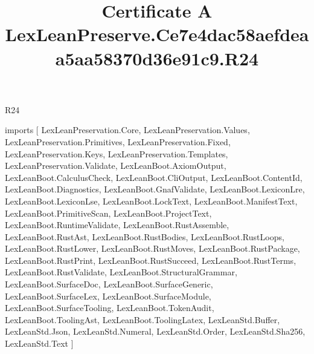 \begin{lexlean}{R24}
\title{Certificate A LexLeanPreserve.Ce7e4dac58aefdeaa5aa58370d36e91c9.R24}
\begin{coremodule}
imports [
  LexLeanPreservation.Core,
  LexLeanPreservation.Values,
  LexLeanPreservation.Primitives,
  LexLeanPreservation.Fixed,
  LexLeanPreservation.Keys,
  LexLeanPreservation.Templates,
  LexLeanPreservation.Validate,
  LexLeanBoot.AxiomOutput,
  LexLeanBoot.CalculusCheck,
  LexLeanBoot.CliOutput,
  LexLeanBoot.ContentId,
  LexLeanBoot.Diagnostics,
  LexLeanBoot.GnafValidate,
  LexLeanBoot.LexiconLre,
  LexLeanBoot.LexiconLse,
  LexLeanBoot.LockText,
  LexLeanBoot.ManifestText,
  LexLeanBoot.PrimitiveScan,
  LexLeanBoot.ProjectText,
  LexLeanBoot.RuntimeValidate,
  LexLeanBoot.RustAssemble,
  LexLeanBoot.RustAst,
  LexLeanBoot.RustBodies,
  LexLeanBoot.RustLoops,
  LexLeanBoot.RustLower,
  LexLeanBoot.RustMoves,
  LexLeanBoot.RustPackage,
  LexLeanBoot.RustPrint,
  LexLeanBoot.RustSucceed,
  LexLeanBoot.RustTerms,
  LexLeanBoot.RustValidate,
  LexLeanBoot.StructuralGrammar,
  LexLeanBoot.SurfaceDoc,
  LexLeanBoot.SurfaceGeneric,
  LexLeanBoot.SurfaceLex,
  LexLeanBoot.SurfaceModule,
  LexLeanBoot.SurfaceTooling,
  LexLeanBoot.TokenAudit,
  LexLeanBoot.ToolingAst,
  LexLeanBoot.ToolingLatex,
  LexLeanStd.Buffer,
  LexLeanStd.Json,
  LexLeanStd.Numeral,
  LexLeanStd.Order,
  LexLeanStd.Sha256,
  LexLeanStd.Text
]


\end{coremodule}
\end{lexlean}

